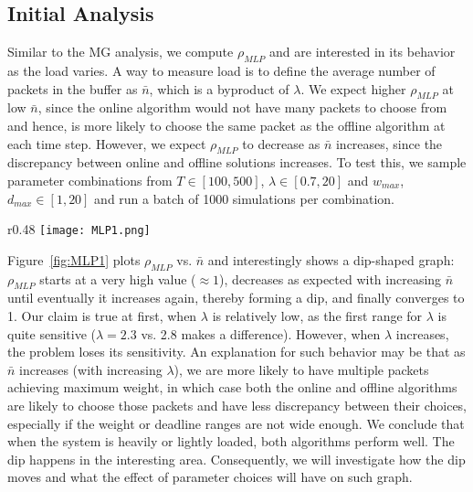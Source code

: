 \documentclass[oribibl]{llncs}
\begin{document}
\subsection{Initial Analysis}
\label{subsec:MLP}


Similar to the MG analysis, we compute $\rho_{MLP}$ and are interested
in its behavior as the load varies. A way to measure load is to define the average number of packets in the buffer as
$\bar{n}$, which is a byproduct of $\lambda$. We expect higher
$\rho_{MLP}$ at low $\bar{n}$, since the online algorithm would not have
many packets to choose from and hence, is more likely to
choose the same packet as the offline algorithm at each time
step. However, we expect $\rho_{MLP}$ to decrease as $\bar{n}$ increases, since the discrepancy between online
and offline solutions increases. To test this, we sample parameter combinations from $T\in [100,500]$, $\lambda \in [0.7,20]$ and $w_{max}$, $d_{max}\in[1,20]$ and run a batch of 1000 simulations per
combination. 

\begin{wrapfigure}[13]{r}{0.48\linewidth}
\vspace{-10pt}
\texttt{[image: MLP1.png]}
\caption{$\rho_{MLP}$ vs. $\bar{n}$}
\label{fig:MLP1}
\end{wrapfigure}

Figure~\ref{fig:MLP1} plots $\rho_{MLP}$ vs. $\bar{n}$
and interestingly shows a dip-shaped graph: $\rho_{MLP}$ starts at a very high value ($\approx1$),
decreases as expected with increasing $\bar{n}$ until
eventually it increases again, thereby forming a dip, and finally
converges to 1. Our claim is true at first,
when $\lambda$ is relatively low, as the first range for $\lambda$ is
quite sensitive ($\lambda=2.3$ vs. 2.8 makes a difference). However,
when $\lambda$ increases, the problem loses its sensitivity. An
explanation for such behavior may be that as $\bar{n}$ increases (with
increasing $\lambda$), we are more likely to have multiple packets
achieving maximum weight, in which case both the online and offline
algorithms are likely to choose those packets and have less
discrepancy between their choices, especially if the weight or
deadline ranges are not wide enough. We conclude that when the system
is heavily or lightly loaded, both algorithms perform well. The dip
happens in the interesting area. Consequently, we will investigate 
how the dip moves and what the effect of parameter choices will have
on such graph.  
\end{document}
